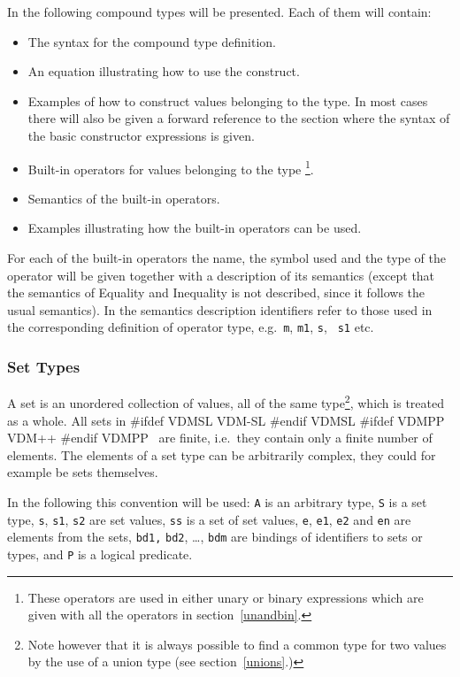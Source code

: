 \documentclass[\pformat,12pt]{article}
\newcommand{\vdmslpp}[2]{%
#ifdef VDMSL
#1
#endif VDMSL
#ifdef VDMPP
#2
#endif VDMPP
}
\newcommand{\vdmsl}{VDM-SL}
\newcommand{\vdmpp}{VDM++}
\begin{document}
In the following compound types will be presented. Each of
them will contain:
\begin{itemize}
\item The syntax for the compound type definition.
\item An equation illustrating how to use the construct.
\item Examples of how to construct values belonging to the type. In
  most cases there will also be given a forward reference to the
  section where the syntax of the basic constructor expressions is given.
\item Built-in operators for values belonging to the
  type \footnote{These operators are used in either unary or binary
    expressions which are given with all the operators in
    section~\ref{unandbin}.}.
\item Semantics of the built-in operators.
\item Examples illustrating how the built-in operators can be used.
\end{itemize}
For each of the built-in operators the name, the symbol used and the
type of the operator will be given together with a description of its
semantics (except that the semantics of Equality and Inequality is not
described, since it follows the usual semantics). In the semantics
description identifiers refer to those used in the corresponding
definition of operator type, e.g.\ {\tt m}, {\tt m1}, {\tt s}, {\tt
  s1} etc.

\subsubsection{Set Types}
\label{sets}

A set is an unordered collection of values, all of the same
type\footnote{Note however that it is always possible to find a common
  type for two values by the use of a union type (see
  section~\ref{unions}.)}, which is treated as a whole. All sets in 
\vdmslpp{\vdmsl}{\vdmpp}\ are finite, i.e.\ they contain only a finite
number of elements. The elements of a set type can be arbitrarily
complex, they could for example be sets themselves.

In the following this convention will be used: {\tt A} is an arbitrary
type, {\tt S} is a set type, {\tt s}, {\tt s1}, {\tt s2} are set
values, {\tt ss} is a set of set values, {\tt e}, {\tt e1}, {\tt e2}
and {\tt en} are elements from the sets, {\tt bd1,} {\tt bd2}, \ldots,
{\tt bdm} are bindings of identifiers to sets or types, and {\tt P} is
a logical predicate.
\end{document}
